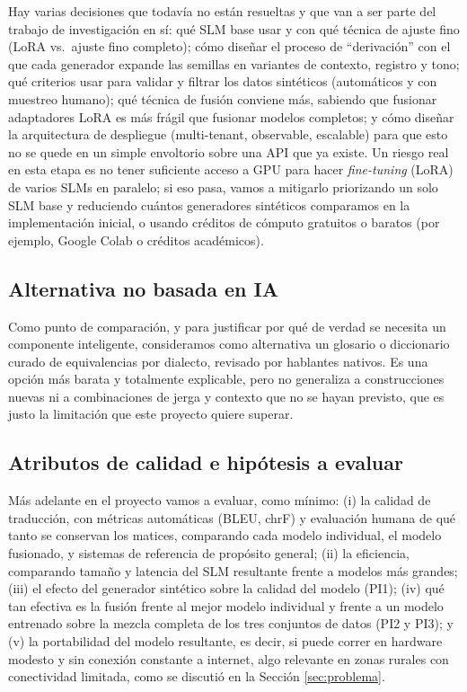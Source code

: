 \documentclass[11pt,a4paper]{article}
\begin{document}
Hay varias decisiones que todavía no están resueltas y que van a ser parte del trabajo de investigación en sí: qué SLM base usar y con qué técnica de ajuste fino (LoRA vs.\ ajuste fino completo); cómo diseñar el proceso de ``derivación'' con el que cada generador expande las semillas en variantes de contexto, registro y tono; qué criterios usar para validar y filtrar los datos sintéticos (automáticos y con muestreo humano); qué técnica de fusión conviene más, sabiendo que fusionar adaptadores LoRA es más frágil que fusionar modelos completos; y cómo diseñar la arquitectura de despliegue (multi-tenant, observable, escalable) para que esto no se quede en un simple envoltorio sobre una API que ya existe. Un riesgo real en esta etapa es no tener suficiente acceso a GPU para hacer \textit{fine-tuning} (LoRA) de varios SLMs en paralelo; si eso pasa, vamos a mitigarlo priorizando un solo SLM base y reduciendo cuántos generadores sintéticos comparamos en la implementación inicial, o usando créditos de cómputo gratuitos o baratos (por ejemplo, Google Colab o créditos académicos).

\subsection{Alternativa no basada en IA}

Como punto de comparación, y para justificar por qué de verdad se necesita un componente inteligente, consideramos como alternativa un glosario o diccionario curado de equivalencias por dialecto, revisado por hablantes nativos. Es una opción más barata y totalmente explicable, pero no generaliza a construcciones nuevas ni a combinaciones de jerga y contexto que no se hayan previsto, que es justo la limitación que este proyecto quiere superar.

\subsection{Atributos de calidad e hipótesis a evaluar}

Más adelante en el proyecto vamos a evaluar, como mínimo: (i) la calidad de traducción, con métricas automáticas (BLEU, chrF) y evaluación humana de qué tanto se conservan los matices, comparando cada modelo individual, el modelo fusionado, y sistemas de referencia de propósito general; (ii) la eficiencia, comparando tamaño y latencia del SLM resultante frente a modelos más grandes; (iii) el efecto del generador sintético sobre la calidad del modelo (PI1); (iv) qué tan efectiva es la fusión frente al mejor modelo individual y frente a un modelo entrenado sobre la mezcla completa de los tres conjuntos de datos (PI2 y PI3); y (v) la portabilidad del modelo resultante, es decir, si puede correr en hardware modesto y sin conexión constante a internet, algo relevante en zonas rurales con conectividad limitada, como se discutió en la Sección \ref{sec:problema}.
\end{document}
